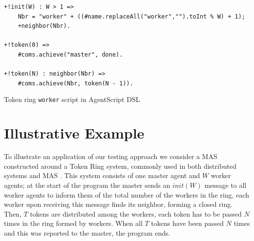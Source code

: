\begin{listing}[!tb]
\centering
\begin{verbatim}
+!init(W) : W > 1 =>
    Nbr = "worker" + ((#name.replaceAll("worker","").toInt % W) + 1);
    +neighbor(Nbr).

+!token(0) =>
    #coms.achieve("master", done).

+!token(N) : neighbor(Nbr) =>
    #coms.achieve(Nbr, token(N - 1)).
\end{verbatim}
\vspace{-5pt}
    \caption{Token ring \texttt{worker} script in AgentScript DSL}
    \label{lst:script_1}
\vspace{-5pt}
\end{listing}

\section{Illustrative Example}
\label{sec:example}
To illustrate an application of our testing approach we consider a MAS constructed around a Token Ring system, commonly used in both distributed systems and MAS \cite{MohajeriParizi2020,Cardoso2013}. This system consists of one master agent and $W$ worker agents; at the start of the program the master sends an $init(W)$ message to all worker agents to inform them of the total number of the workers in the ring, each worker upon receiving this message finds its neighbor, forming a closed ring. Then, $T$ tokens are distributed among the workers, each token has to be passed $N$ times in the ring formed by workers. When all $T$ tokens have been passed $N$ times and this was reported to the master, the program ends.


 
